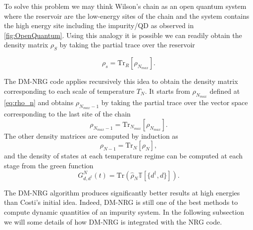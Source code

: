 To solve this problem we may think Wilson's chain as an open quantum system where the reservoir are the low-energy sites of the chain and the system contains the high energy site including the impurity/QD  as observed in \ref{fig:OpenQuantum}. Using this analogy it is possible we can readily obtain the density matrix $\rho_S$ by taking the partial trace over the reservoir

\begin{equation}
\rho_s = \text{Tr}_R[\rho_{N_{max}}].
\end{equation} 

The DM-NRG code applies recursively this idea to obtain the density matrix corresponding to each scale of temperature $T_N$. It starts from $\rho_{N_{max}}$ defined at \eqref{eq:rho_n} and obtains $\rho_{N_{max}-1} $ by taking the partial trace over the vector space corresponding to the last site of the chain
\begin{equation}
\rho_{N_{max}-1} = \text{Tr}_{N_{max}}[\rho_{N_{max}}].
\end{equation}
\noindent The other density matrices are computed by induction as 
\begin{equation}
\rho_{N-1} = \text{Tr}_{N}[\rho_{N}],
\end{equation}
and the density of states at each temperature regime can be computed at each stage from the green function 
\begin{equation}
G_{d,d^{\dagger}}^{N} (t) = \text{Tr} \left( \hat{\rho}_{N}\mathbb{T}\left[ \{ d^{\dagger},d \} \right] \right). 
\end{equation}

The DM-NRG algorithm produces significantly better results  at high energies than Costi's initial idea. Indeed, DM-NRG is still one of the best methods to compute dynamic quantities of an impurity system. In the following subsection we will some details of how DM-NRG is integrated with the NRG code. 








